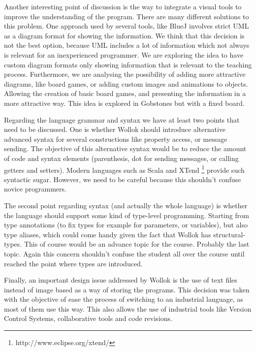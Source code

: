 \medskip 
Another interesting point of discussion is the way to integrate a visual tools to improve the understanding of the program. 
There are many different solutions to this problem. 
One approach used by several tools, like BlueJ \cite{bennedsen_bluej_2010} involves strict UML as a diagram format for showing the information.
We think that this decision is not the best option, because UML includes a lot of information which not always is relevant for an inexperienced programmer. 
We are exploring the idea to have custom diagram formats only showing information that is relevant to the teaching process. 
Furthermore, we are analysing the possibility of adding more attractive diagrams, like board games, or adding custom images and animations to objects.
Allowing the creation of basic board games, and presenting the information in a more attractive way. 
This idea is explored in Gobstones \cite{lopez_nombre_2012} but with a fixed board.

\medskip
Regarding the language grammar and syntax we have at least two points that need to be discussed. 
One is whether Wollok should introduce alternative
advanced syntax for several constructions like property access, or message
sending. The objective of this alternative syntax would be to reduce the amount
of code and syntax elements (\eg parenthesis, dot for sending messages, or calling getters and
setters). Modern languages such as Scala\cite{Oder04a} and
XTend \footnote{http://www.eclipse.org/xtend/} provide such syntactic sugar.
However, we need to be careful because this shouldn't confuse novice programmers.

The second point regarding syntax (and actually the whole language) is whether
the language should support some kind of type-level programming. Starting from
type annotations (to fix types for example for parameters, or variables), but
also type aliases, which could come handy given the fact that Wollok has
structural-types. This of course would be an advance topic for the course.
Probably the last topic. Again this concern shouldn't confuse the student all
over the course until reached the point where types are introduced.

Finally, an important design issue addressed by Wollok is the use of text files instead of image
based as a way of storing the programs. This decision was taken with the objective of ease the 
process of switching to an industrial language, as most of them use this way. 
This also allows the use of industrial tools like Version Control Systems, collaborative tools 
and code revisions.

